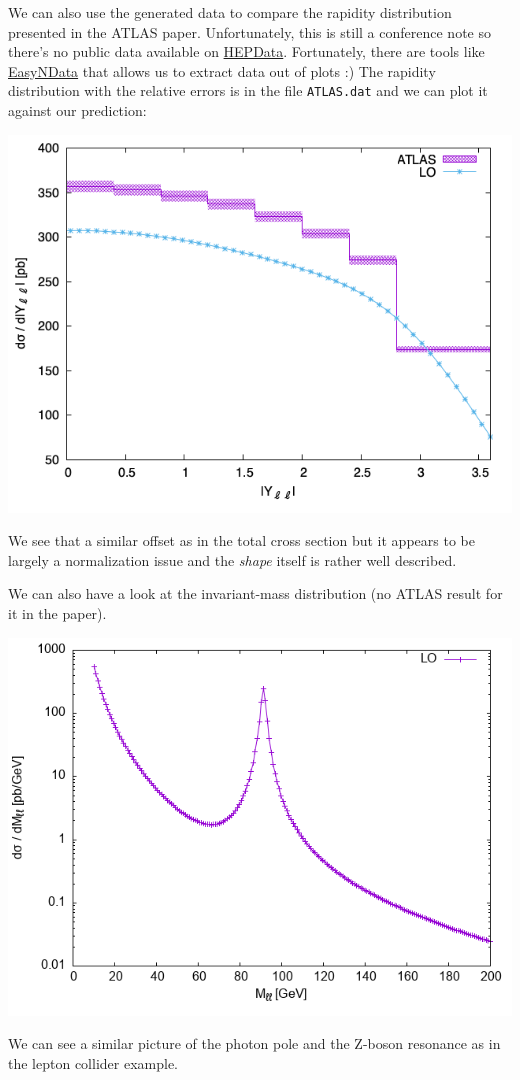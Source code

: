 \documentclass[11pt]{article}
\begin{document}
We can also use the generated data to compare the rapidity distribution presented in the ATLAS paper.
Unfortunately, this is still a conference note so there's no public data available on \href{https://www.hepdata.net/}{HEPData}.
Fortunately, there are tools like \href{https://arxiv.org/abs/0710.2896}{EasyNData} that allows us to extract data out of plots :)
The rapidity distribution with the relative errors is in the file \texttt{ATLAS.dat} and we can plot it against our prediction:
\begin{center}
\includegraphics[width=.9\linewidth]{Yll.png}
\label{}
\end{center}
We see that a similar offset as in the total cross section but it appears to be largely a normalization issue and the \emph{shape} itself is rather well described.

We can also have a look at the invariant-mass distribution (no ATLAS result for it in the paper).
\begin{center}
\includegraphics[width=.9\linewidth]{Mll.png}
\label{}
\end{center}
We can see a similar picture of the photon pole and the Z-boson resonance as in the lepton collider example.
\end{document}
